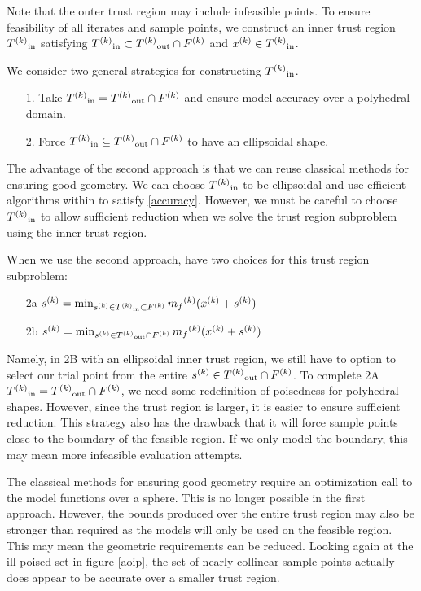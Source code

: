 Note that the outer trust region may include infeasible points.
To ensure feasibility of all iterates and sample points, we construct an inner trust region ${T^{(k)}}_{\text{in}}$  satisfying 
${T^{(k)}}_{\text{in}} \subset {T^{(k)}}_{\text{out}} \cap {F}^{(k)}$ and ${x}^{(k)} \in {T^{(k)}}_{\text{in}}$.


We consider two general strategies for constructing ${T^{(k)}}_{\text{in}}$.
\begin{itemize}
\item[1.] Take $\label{redpill} {T^{(k)}}_{\text{in}} = {T^{(k)}}_{\text{out}} \cap {F}^{(k)}$ and ensure model accuracy over a polyhedral domain.
\item[2.] Force $\label{bluepill} {T^{(k)}}_{\text{in}} \subseteq {T^{(k)}}_{\text{out}} \cap {F}^{(k)}$ to have an ellipsoidal shape.
\end{itemize}

The advantage of the second approach is that we can reuse classical methods for ensuring good geometry.
We can choose ${T^{(k)}}_{\text{in}}$ to be ellipsoidal and use efficient algorithms within \cite{DUMMY:intro_book} to satisfy \cref{accuracy}.
However, we must be careful to choose ${T^{(k)}}_{\text{in}}$ to allow sufficient reduction when we solve the trust region subproblem using the inner trust region.


When we use the second approach, have two choices for this trust region subproblem:
\begin{center}
\begin{itemize}
\label{which_trust_region}
\item[2a] ${s}^{(k)} = \min_{{s}^{(k)} \in {T^{(k)}}_{\text{in}} \subset {F}^{(k)}} {{m}_f}^{(k)}({x}^{(k)} + {s}^{(k)}) \label{search_a_little}$
\item[2b] ${s}^{(k)} = \min_{{s}^{(k)} \in {T^{(k)}}_{\text{out}} \cap {F}^{(k)}} {{m}_f}^{(k)}({x}^{(k)} + {s}^{(k)}) \label{search_a_lot}$
\end{itemize}
\end{center}
 
Namely, in 2B with an ellipsoidal inner trust region, we still have to option to select our trial point from the entire ${s}^{(k)} \in {T^{(k)}}_{\text{out}} \cap {F}^{(k)}$.
To complete 2A ${T^{(k)}}_{\text{in}} = {T^{(k)}}_{\text{out}} \cap {F}^{(k)}$, we need some redefinition of poisedness for polyhedral shapes.
However, since the trust region is larger, it is easier to ensure sufficient reduction.
This strategy also has the drawback that it will force sample points close to the boundary of the feasible region.
If we only model the boundary, this may mean more infeasible evaluation attempts.

The classical methods for ensuring good geometry require an optimization call to the model functions over a sphere.
This is no longer possible in the first approach.
However, the bounds produced over the entire trust region may also be stronger than required as the models will only be used on the feasible region.
This may mean the geometric requirements can be reduced.
Looking again at the ill-poised set in figure \cref{aoip}, the set of nearly collinear sample points actually does appear to be accurate over a smaller trust region.


